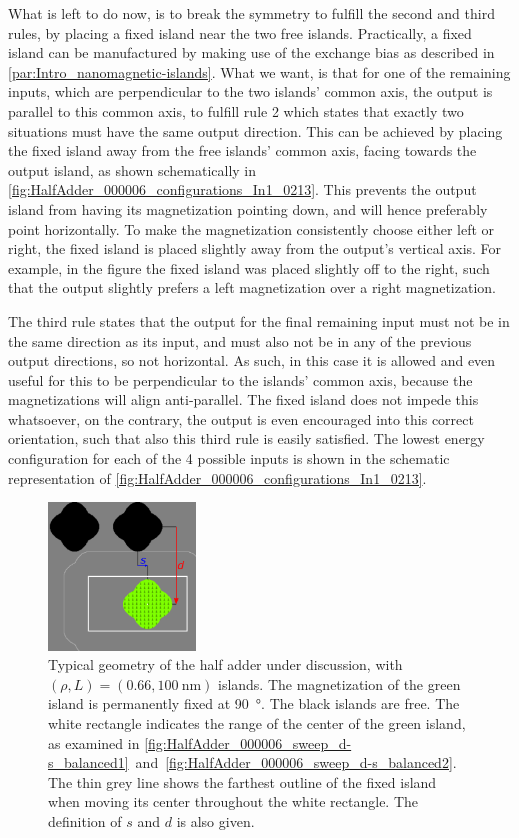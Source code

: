\documentclass[11pt,a4paper,english]{article}
\begin{document}
What is left to do now, is to break the symmetry to fulfill the second and third rules, by placing a fixed island near the two free islands. Practically, a fixed island can be manufactured by making use of the exchange bias as described in \cref{par:Intro_nanomagnetic-islands}. What we want, is that for one of the remaining inputs, which are perpendicular to the two islands' common axis, the output is parallel to this common axis, to fulfill rule 2 which states that exactly two situations must have the same output direction. This can be achieved by placing the fixed island away from the free islands' common axis, facing towards the output island, as shown schematically in \cref{fig:HalfAdder_000006_configurations_In1_0213}. This prevents the output island from having its magnetization pointing down, and will hence preferably point horizontally. To make the magnetization consistently choose either left or right, the fixed island is placed slightly away from the output's vertical axis. For example, in the figure the fixed island was placed slightly off to the right, such that the output slightly prefers a left magnetization over a right magnetization. \par
The third rule states that the output for the final remaining input must not be in the same direction as its input, and must also not be in any of the previous output directions, so not horizontal. As such, in this case it is allowed and even useful for this to be perpendicular to the islands' common axis, because the magnetizations will align anti-parallel. The fixed island does not impede this whatsoever, on the contrary, the output is even encouraged into this correct orientation, such that also this third rule is easily satisfied. The lowest energy configuration for each of the 4 possible inputs is shown in the schematic representation of \cref{fig:HalfAdder_000006_configurations_In1_0213}.

\begin{figure}
    \centering
    \includegraphics[width=0.35\textwidth]{Figures/half_adder/regions000006.pdf}
    \caption{Typical geometry of the half adder under discussion, with $(\rho, L) = (0.66, \SI{100}{\nano\metre})$ islands. The magnetization of the green island is permanently fixed at \SI{90}{\degree}. The black islands are free. The white rectangle indicates the range of the center of the green island, as examined in \cref{fig:HalfAdder_000006_sweep_d-s_balanced1}~and~\ref{fig:HalfAdder_000006_sweep_d-s_balanced2}. The thin grey line shows the farthest outline of the fixed island when moving its center throughout the white rectangle. The definition of $s$ and $d$ is also given.}
    \label{fig:HalfAdder_000006_geometryTypical}
\end{figure}
\end{document}
